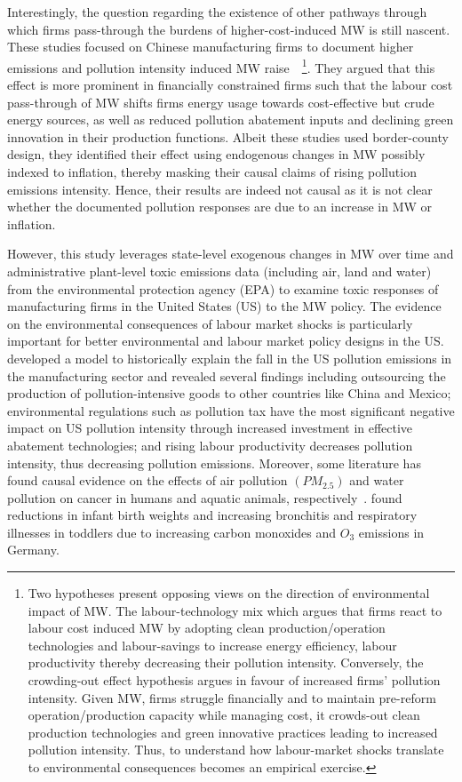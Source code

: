 \documentclass[12pt, english]{article}
\begin{document}
    Interestingly, the question regarding the existence of other pathways through which firms pass-through the burdens of higher-cost-induced MW is still nascent. These studies focused on Chinese manufacturing firms to document higher emissions and pollution intensity induced MW raise~\parencite{li2023does, zhang2023unintended}~\footnote{\tiny Two hypotheses present opposing views on the direction of environmental impact of MW. The labour-technology mix which argues that firms react to labour cost induced MW by adopting clean production/operation technologies and labour-savings to increase energy efficiency, labour productivity thereby decreasing their pollution intensity. Conversely, the crowding-out effect hypothesis argues in favour of increased firms' pollution intensity. Given MW, firms struggle financially and to maintain pre-reform operation/production capacity while managing cost, it crowds-out clean production technologies and green innovative practices leading to increased pollution intensity. Thus, to understand how labour-market shocks translate to environmental consequences becomes an empirical exercise.}. They argued that this effect is more prominent in financially constrained firms such that the labour cost pass-through of MW shifts firms energy usage towards cost-effective but crude energy sources, as well as reduced pollution abatement inputs and declining green innovation in their production functions. Albeit these studies used border-county design, they identified their effect using endogenous changes in MW possibly indexed to inflation, thereby masking their causal claims of rising pollution emissions intensity. Hence, their results are indeed not causal as it is not clear whether the documented pollution responses are due to an increase in MW or inflation.

    However, this study leverages state-level exogenous changes in MW over time and administrative plant-level toxic emissions data (including air, land and water) from the environmental protection agency (EPA) to examine toxic responses of manufacturing firms in the United States (US) to the MW policy. The evidence on the environmental consequences of labour market shocks is particularly important for better environmental and labour market policy designs in the US.~\cite{shapiro2018pollution} developed a model to historically explain the fall in the US pollution emissions in the manufacturing sector and revealed several findings including outsourcing the production of pollution-intensive goods to other countries like China and Mexico; environmental regulations such as pollution tax have the most significant negative impact on US pollution intensity through increased investment in effective abatement technologies; and rising labour productivity decreases pollution intensity, thus decreasing pollution emissions. Moreover, some literature has found causal evidence on the effects of air pollution $(PM_{2.5})$ and water pollution on cancer in humans and aquatic animals, respectively~\parencite{turner2020outdoor, turner2017ambient, baines2021linking}. \cite{coneus2012pollution} found reductions in infant birth weights and increasing bronchitis and respiratory illnesses in toddlers due to increasing carbon monoxides and $O_{3}$ emissions in Germany.
\end{document}

